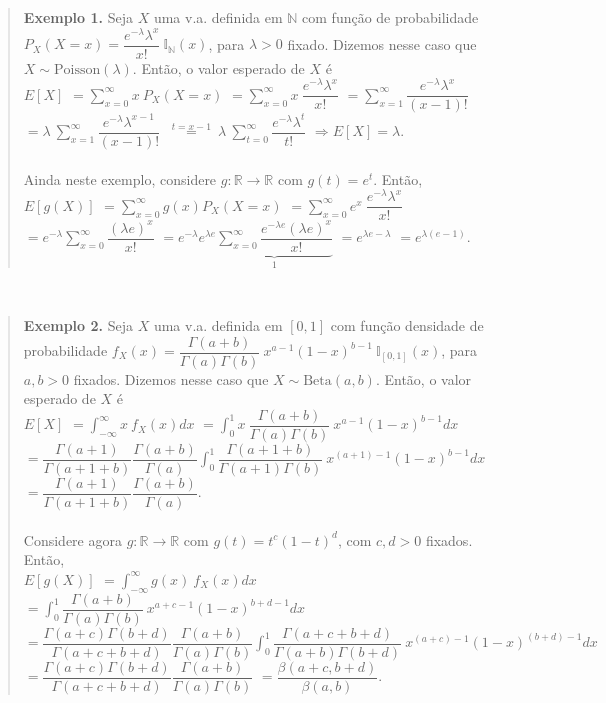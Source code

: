 \documentclass[
]{book}
\begin{document}
\begin{quote}
\textbf{Exemplo 1.} Seja \(X\) uma v.a. definida em \(\mathbb{N}\) com função de probabilidade \(P_X(X=x)=\dfrac{e^{-\lambda}\lambda^x}{x!}~\mathbb{I}_{\mathbb{N}}(x)\), para \(\lambda>0\) fixado. Dizemos nesse caso que \(X \sim \text{Poisson}(\lambda)\). Então, o valor esperado de \(X\) é\\
\(E\left[X\right]\) \(=\displaystyle\sum_{x=0}^\infty x~P_X(X=x)\)
\(=\displaystyle\sum_{x=0}^\infty x~\dfrac{e^{-\lambda}\lambda^x}{x!}\)
\(=\displaystyle\sum_{x=1}^\infty \dfrac{e^{-\lambda}\lambda^x}{(x-1)!}\)
\(=\displaystyle\lambda~\sum_{x=1}^\infty \dfrac{e^{-\lambda}\lambda^{x-1}}{(x-1)!}\)
\(~\overset{t=x-1}{=}~\displaystyle\lambda~\sum_{t=0}^\infty \dfrac{e^{-\lambda}\lambda^{t}}{t!}\)
\(\Longrightarrow E\left[X\right] = \lambda\).\\
\(~\)\\
Ainda neste exemplo, considere \(g:\mathbb{R}\rightarrow\mathbb{R}\) com \(g(t) = e^t\). Então,\\
\(E\left[g(X)\right]\) \(=\displaystyle\sum_{x=0}^\infty g(x)P_X(X=x)\) \(=\displaystyle\sum_{x=0}^\infty e^x~\dfrac{e^{-\lambda}\lambda^x}{x!}\) \(=\displaystyle e^{-\lambda}\sum_{x=0}^\infty \dfrac{(\lambda e)^x}{x!}\) \(=\displaystyle e^{-\lambda}e^{\lambda e}\underbrace{\sum_{x=0}^{\infty} \dfrac{e^{-\lambda e}(\lambda e)^x}{x!}}_{1}\)
\(=e^{\lambda e-\lambda}\) \(=e^{\lambda(e-1)}\).
\end{quote}

\(~\)

\begin{quote}
\textbf{Exemplo 2.} Seja \(X\) uma v.a. definida em \([0,1]\) com função densidade de probabilidade \(f_X(x)=\dfrac{\Gamma(a+b)}{\Gamma(a)\Gamma(b)}~x^{a-1}(1-x)^{b-1}~\mathbb{I}_{[0,1]}(x)\), para \(a,b>0\) fixados. Dizemos nesse caso que \(X \sim \text{Beta}(a,b)\). Então, o valor esperado de \(X\) é\\
\(E[X]\) \(=\displaystyle\int_{-\infty}^\infty x~f_X(x)dx\)
\(=\displaystyle\int_0^1 x~\dfrac{\Gamma(a+b)}{\Gamma(a)\Gamma(b)}~x^{a-1}(1-x)^{b-1}dx\)
\(=\displaystyle\dfrac{\Gamma (a+1)}{\Gamma(a+1+b)}\dfrac{\Gamma(a+b)}{\Gamma(a)}\int_0^1\dfrac{\Gamma(a+1+b)}{\Gamma(a+1)\Gamma(b)}~x^{(a+1)-1}(1-x)^{b-1}dx\)
\(=\dfrac{\Gamma (a+1)}{\Gamma(a+1+b)}\dfrac{\Gamma(a+b)}{\Gamma(a)}\).\\
\(~\)\\
Considere agora \(g:\mathbb{R}\rightarrow\mathbb{R}\) com \(g(t) = t^c(1-t)^d\), com \(c,d>0\) fixados. Então,\\
\(E[g(X)]\) \(=\displaystyle\int_{-\infty}^\infty g(x)~f_X(x)dx\)
\(=\displaystyle\int_0^1 \dfrac{\Gamma(a+b)}{\Gamma(a)\Gamma(b)}~x^{a+c-1}(1-x)^{b+d-1}dx\)
\(=\displaystyle\dfrac{\Gamma (a+c)\Gamma(b+d)}{\Gamma(a+c+b+d)}\dfrac{\Gamma(a+b)}{\Gamma(a)\Gamma(b)}\int_0^1\dfrac{\Gamma(a+c+b+d)}{\Gamma(a+b)\Gamma(b+d)}~x^{(a+c)-1}(1-x)^{(b+d)-1}dx\)
\(=\dfrac{\Gamma(a+c)\Gamma(b+d)}{\Gamma(a+c+b+d)}\dfrac{\Gamma(a+b)}{\Gamma(a)\Gamma(b)}\)
\(=\dfrac{\beta(a+c,b+d)}{\beta(a,b)}\).
\end{quote}
\end{document}
